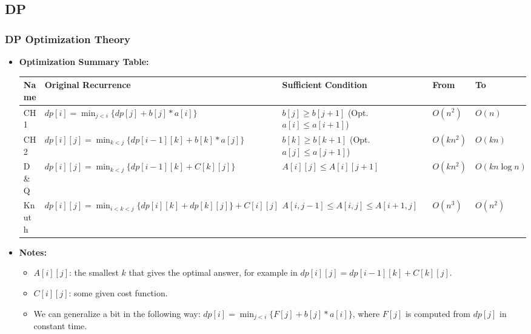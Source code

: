 \subsection{DP}

\subsubsection{DP Optimization Theory}

\begin{small}
\begin{itemize}
    \item \textbf{Optimization Summary Table:}
    \begin{center}
    \begin{tabular}{|p{0.8cm}|p{4.5cm}|p{3.3cm}|p{0.9cm}|p{1.3cm}|}
        \hline
        \textbf{Name} & \textbf{Original Recurrence} & \textbf{Sufficient Condition} & \textbf{From} & \textbf{To} \\ 
        \hline
        CH 1 & $dp[i] = \min_{j<i}\{dp[j]+b[j]*a[i]\}$ & $b[j] \geq b[j+1]$ (Opt. $a[i] \leq a[i+1]$) & $O(n^2)$ & $O(n)$ \\ 
        \hline
        CH 2 & $dp[i][j] = \min_{k<j}\{dp[i-1][k] + b[k] * a[j]\}$ & $b[k] \geq b[k+1]$ (Opt. $a[j] \leq a[j+1]$) & $O(kn^2)$ & $O(kn)$ \\ 
        \hline
        D\&Q & $dp[i][j] = \min_{k<j}\{dp[i-1][k] + C[k][j]\}$ & $A[i][j] \leq A[i][j+1]$ & $O(kn^2)$ & $O(kn\log n)$ \\ 
        \hline
        Knuth & $dp[i][j] = \min_{i<k<j} \{dp[i][k] + dp[k][j] \} + C[i][j] $ & $A[i, j -1] \leq A[i, j] \leq A[i+1, j]$ & $O(n^3)$ & $O(n^2)$ \\ 
        \hline
    \end{tabular} 
    \end{center}

    \item \textbf{Notes:}
    \begin{itemize}
        \item $A[i][j]$: the smallest $k$ that gives the optimal answer, for example in $dp[i][j] = dp[i-1][k] + C[k][j]$.
        \item $C[i][j]$: some given cost function.
        \item We can generalize a bit in the following way: $dp[i] = \min_{j<i}\{F[j]+b[j] * a[i]\}$, where $F[j]$ is computed from $dp[j]$ in constant time.
    \end{itemize}
\end{itemize}
\end{small}


